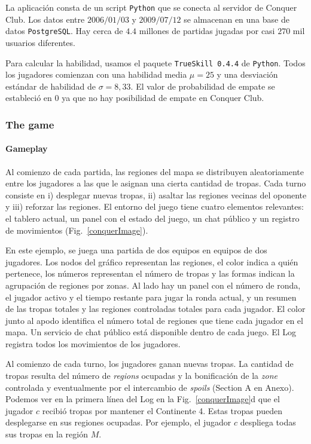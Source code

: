 \documentclass[a4paper,10pt]{book}
\theoremstyle{definition}
\begin{document}

La aplicación consta de un script \texttt{Python} que se conecta al servidor de Conquer Club.
%
Los datos entre $2006/01/03$ y $2009/07/12$ se almacenan en una base de datos \texttt{PostgreSQL}.
Hay cerca de $4.4$ millones de partidas jugadas por casi $270$ mil usuarios diferentes.

Para calcular la habilidad, usamos el paquete \texttt{TrueSkill 0.4.4} de \texttt{Python}.
%
Todos los jugadores comienzan con una habilidad media $\mu = 25$ y una desviación estándar de habilidad de $\sigma = 8,33$.
%
El valor de probabilidad de empate se estableció en 0 ya que no hay posibilidad de empate en Conquer Club.

\subsubsection{The game}

\paragraph{Gameplay}\label{sub:gameplay}

Al comienzo de cada partida, las regiones del mapa se distribuyen aleatoriamente entre los jugadores a las que le asignan una cierta cantidad de tropas.
%
Cada turno consiste en i) desplegar nuevas tropas, ii) asaltar las regiones vecinas del oponente y iii) reforzar las regiones.
%
El entorno del juego tiene cuatro elementos relevantes: el tablero actual, un panel con el estado del juego, un chat p\'ublico y un registro de movimientos (Fig.~\ref{conquerImage}).


En este ejemplo, se juega una partida de dos equipos en equipos de dos jugadores.
%
Los nodos del gráfico representan las regiones, el color indica a quién pertenece, los n\'umeros representan el n\'umero de tropas y las formas indican la agrupación de regiones por zonas.
%
Al lado hay un panel con el n\'umero de ronda, el jugador activo y el tiempo restante para jugar la ronda actual, y un resumen de las tropas totales y las regiones controladas totales para cada jugador.
%
El color junto al apodo identifica el n\'umero total de regiones que tiene cada jugador en el mapa.
%
Un servicio de chat p\'ublico está disponible dentro de cada juego.
%
El Log registra todos los movimientos de los jugadores.


Al comienzo de cada turno, los jugadores ganan nuevas tropas.
%
La cantidad de tropas resulta del n\'umero de \emph{regions} ocupadas y la bonificación de la \emph{zone} controlada y eventualmente por el intercambio de \emph{spoils} (Section A en Anexo).
%
Podemos ver en la primera línea del Log en la Fig.~\ref{conquerImage}d que el jugador $c$ recibió tropas por mantener el Continente 4.
%
Estas tropas pueden desplegarse en sus regiones ocupadas.
%
Por ejemplo, el jugador $c$ despliega todas sus tropas en la región $M$.
\end{document}
